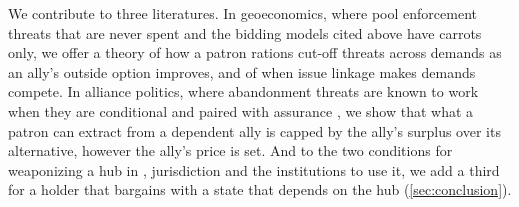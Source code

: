 We contribute to three literatures. In geoeconomics, where \citet{clayton2026framework} pool enforcement threats that are never spent and the bidding models cited above have carrots only, we offer a theory of how a patron rations cut-off threats across demands as an ally's outside option improves, and of when issue linkage makes demands compete. In alliance politics, where abandonment threats are known to work when they are conditional and paired with assurance \citep{gerzhoy2015alliance, blankenship2023burden}, we show that what a patron can extract from a dependent ally is capped by the ally's surplus over its alternative, however the ally's price is set. And to the two conditions for weaponizing a hub in \citet{farrell2019weaponized}, jurisdiction and the institutions to use it, we add a third for a holder that bargains with a state that depends on the hub (\cref{sec:conclusion}).

